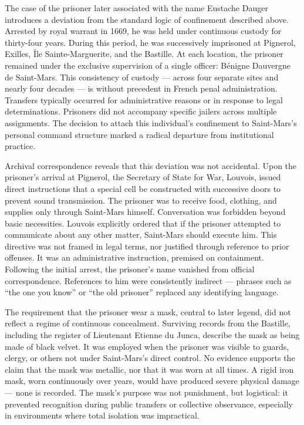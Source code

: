 The case of the prisoner later associated with the name Eustache Dauger introduces a deviation from the standard logic of confinement described above. Arrested by royal warrant in 1669, he was held under continuous custody for thirty-four years. During this period, he was successively imprisoned at Pignerol, Exilles, Île Sainte-Marguerite, and the Bastille. At each location, the prisoner remained under the exclusive supervision of a single officer: Bénigne Dauvergne de Saint-Mars. This consistency of custody — across four separate sites and nearly four decades — is without precedent in French penal administration. Transfers typically occurred for administrative reasons or in response to legal determinations. Prisoners did not accompany specific jailers across multiple assignments. The decision to attach this individual’s confinement to Saint-Mars’s personal command structure marked a radical departure from institutional practice.

Archival correspondence reveals that this deviation was not accidental. Upon the prisoner’s arrival at Pignerol, the Secretary of State for War, Louvois, issued direct instructions that a special cell be constructed with successive doors to prevent sound transmission. The prisoner was to receive food, clothing, and supplies only through Saint-Mars himself. Conversation was forbidden beyond basic necessities. Louvois explicitly ordered that if the prisoner attempted to communicate about any other matter, Saint-Mars should execute him. This directive was not framed in legal terms, nor justified through reference to prior offenses. It was an administrative instruction, premised on containment. Following the initial arrest, the prisoner’s name vanished from official correspondence. References to him were consistently indirect — phrases such as “the one you know” or “the old prisoner” replaced any identifying language.

The requirement that the prisoner wear a mask, central to later legend, did not reflect a regime of continuous concealment. Surviving records from the Bastille, including the register of Lieutenant Etienne du Junca, describe the mask as being made of black velvet. It was employed when the prisoner was visible to guards, clergy, or others not under Saint-Mars’s direct control. No evidence supports the claim that the mask was metallic, nor that it was worn at all times. A rigid iron mask, worn continuously over years, would have produced severe physical damage — none is recorded. The mask’s purpose was not punishment, but logistical: it prevented recognition during public transfers or collective observance, especially in environments where total isolation was impractical.


